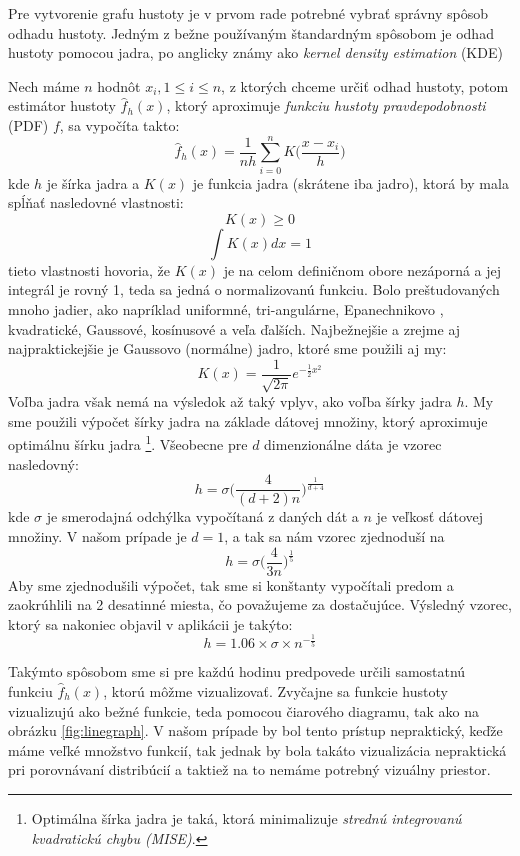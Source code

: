 Pre vytvorenie grafu hustoty je v prvom rade potrebné vybrať správny spôsob odhadu hustoty. Jedným z bežne používaným štandardným spôsobom je odhad hustoty pomocou jadra, po anglicky známy ako \textit{kernel density estimation} (KDE) \cite{Rosenblatt, Parzen}

Nech máme $ n $ hodnôt $ x_{i}, 1 \leq i \leq n $, z ktorých chceme určiť odhad hustoty, potom estimátor hustoty $ \hat{f}_h(x) $, ktorý aproximuje \textit{funkciu hustoty pravdepodobnosti} (PDF) $ f $, sa vypočíta takto:
\[
	\hat{f}_h(x) = \dfrac{1}{nh} \sum_{i=0}^{n}K\Big(\dfrac{x - x_{i}}{h}\Big)
\]
kde $ h $ je šírka jadra a $ K(x) $ je funkcia jadra (skrátene iba jadro), ktorá by mala spĺňať nasledovné vlastnosti:
\[  K(x) \geq 0 \]
\[  \int K(x) dx = 1 \]
tieto vlastnosti hovoria, že $ K(x) $ je na celom definičnom obore nezáporná a jej integrál je rovný 1, teda sa jedná o normalizovanú funkciu. Bolo preštudovaných mnoho jadier, ako napríklad uniformné, tri-angulárne, Epanechnikovo \cite{Turlach}, kvadratické, Gaussové, kosínusové a veľa ďalších. Najbežnejšie a zrejme aj najpraktickejšie \cite{Minnotte} je Gaussovo (normálne) jadro, ktoré sme použili aj my:
\[
	K(x) = \dfrac{1}{\sqrt{2\pi}}e^{-\frac{1}{2}x^2}
\]
Voľba jadra však nemá na výsledok až taký vplyv, ako voľba šírky jadra $ h $. My sme použili výpočet šírky jadra na základe dátovej množiny, ktorý aproximuje optimálnu šírku jadra \cite{Scott, BowmanAzzalani} \footnote{Optimálna šírka jadra je taká, ktorá minimalizuje \textit{strednú integrovanú kvadratickú chybu (MISE)}.}. Všeobecne pre $ d $ dimenzionálne dáta je vzorec nasledovný:
\[
	h = \sigma \Big(\frac{4}{(d + 2)n}\Big)^{\frac{1}{d+4}}
\]
kde $ \sigma $ je smerodajná odchýlka vypočítaná z daných dát a $ n $ je veľkosť dátovej množiny. V našom prípade je $ d = 1 $, a tak sa nám vzorec zjednoduší na
\[
	h = \sigma \Big(\dfrac{4}{3n}\Big)^{\frac{1}{5}}
\] 
Aby sme zjednodušili výpočet, tak sme si konštanty vypočítali predom a zaokrúhlili na 2 desatinné miesta, čo považujeme za dostačujúce. Výsledný vzorec, ktorý sa nakoniec objavil v aplikácii je takýto:
\[
	h = 1.06 \times \sigma \times n^{-\frac{1}{5}}
\]

Takýmto spôsobom sme si pre každú hodinu predpovede určili samostatnú funkciu $ \hat{f}_{h}(x) $, ktorú môžme vizualizovať. Zvyčajne sa funkcie hustoty vizualizujú ako bežné funkcie, teda pomocou čiarového diagramu, tak ako na obrázku \ref{fig:linegraph}. V našom prípade by bol tento prístup nepraktický, keďže máme veľké množstvo funkcií, tak jednak by bola takáto vizualizácia nepraktická pri porovnávaní distribúcií a taktiež na to nemáme potrebný vizuálny priestor.

